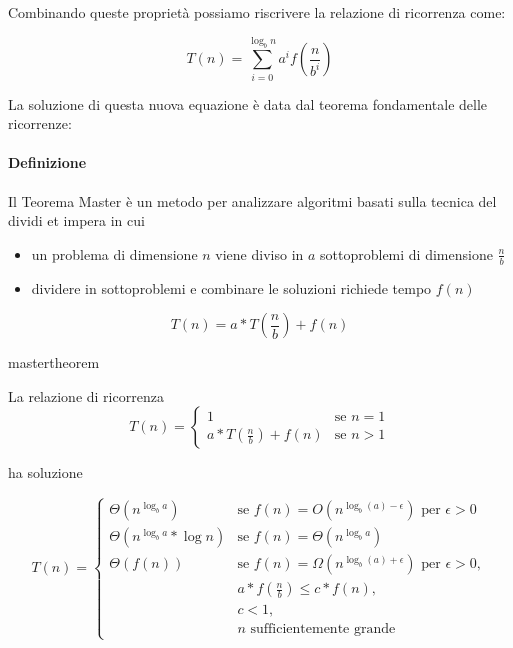 Combinando queste proprietà possiamo riscrivere la relazione di ricorrenza come:

\begin{equation} \label{eq:recursion_tree_sum}
T(n) = \sum_{i=0}^{\log_b{n}}{a^if\left(\frac{n}{b^i}\right)}
\end{equation}

La soluzione di questa nuova equazione è data dal teorema fondamentale delle ricorrenze:

\paragraph{Definizione}

Il Teorema Master è un metodo per analizzare algoritmi basati sulla tecnica del dividi et impera in cui

\begin{itemize}
\item un problema di dimensione $n$ viene diviso in $a$ sottoproblemi di dimensione $\frac{n}{b}$
\item dividere in sottoproblemi e combinare le soluzioni richiede tempo $f(n)$
\end{itemize}

\begin{equation}
T(n) = a * T\left(\frac{n}{b}\right) + f(n)
\end{equation}


\begin{teorema}{}{mastertheorem}

La relazione di ricorrenza
\begin{equation}
T(n) = 
\begin{cases}
1							& \mbox{se } n = 1\\ 
a*T(\frac{n}{b}) + f(n)		& \mbox{se } n > 1
\end{cases}
\end{equation}

ha soluzione

\begin{equation}
T(n) = 
\begin{cases}
\Theta(n^{\log_b{a}})			& \mbox{se } f(n) = O(n^{\log_b{(a)} - \epsilon}) \mbox{ per } \epsilon > 0\\ 
\Theta(n^{\log_b{a}}*\log{n})			& \mbox{se } f(n) = \Theta(n^{\log_b{a}})  \\ 
\Theta(f(n))			& \mbox{se } f(n) = \Omega(n^{\log_b{(a)} + \epsilon})  \mbox{ per } \epsilon > 0, \\ 
& a*f(\frac{n}{b}) \leq c*f(n), \\ 
& c < 1, \\
& n \mbox{ sufficientemente grande}
\end{cases}
\end{equation}

\end{teorema}

